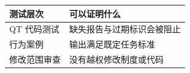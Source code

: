 \begin{tabular}{@{}P{4.0cm}P{8.5cm}@{}}
\toprule
\textbf{测试层次} & \textbf{可以证明什么} \\
\midrule
QT 代码测试 & 缺失报告与过期标识会被阻止 \\
行为案例 & 输出满足既定任务标准 \\
修改范围审查 & 没有越权修改制度或代码 \\
\bottomrule
\end{tabular}
